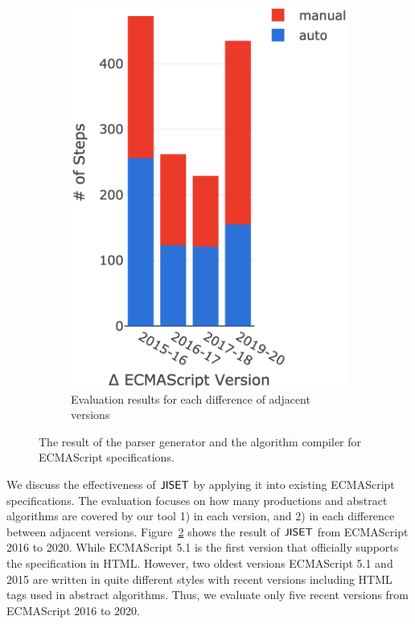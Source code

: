 \begin{figure}[t]
\begin{subfigure}{0.20\textwidth}
    \includegraphics[width=\textwidth]{img/all-version-sem-delta.png}
    \caption{Evaluation results for each difference of adjacent versions}
    \label{fig:semantics-all-version-delta}
  \end{subfigure}
  \caption{The result of the parser generator and the algorithm compiler for
  ECMAScript specifications.}
  \label{fig:all-version}
\end{figure}

We discuss the effectiveness of \( \text{\sf JISET} \) by applying it into existing ECMAScript specifications.
The evaluation focuses on how many productions and abstract algorithms are covered by
our tool 1) in each version, and 2) in each difference between adjacent versions.
Figure~\ref{fig:all-version} shows the result of \( \text{\sf JISET} \) from ECMAScript 2016
to 2020. While ECMAScript 5.1 is the first version that officially supports
the specification in HTML. However, two oldest versions ECMAScript 5.1 and 2015 are written
in quite different styles with recent versions including HTML tags used in abstract algorithms.
Thus, we evaluate only five recent versions from ECMAScript 2016 to 2020.

